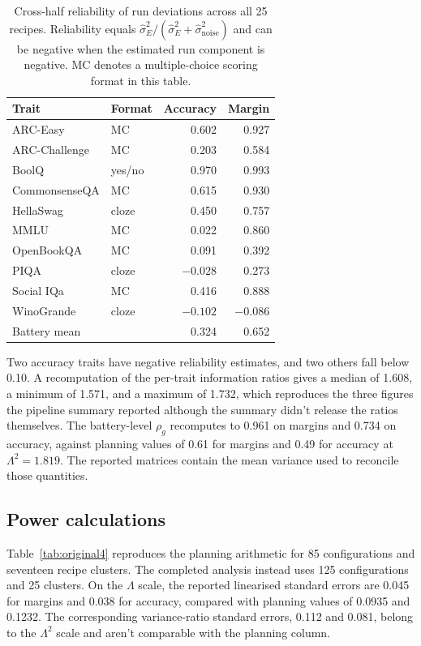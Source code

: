 \begin{table}[!htb]
\centering
\caption{Cross-half reliability of run deviations across all 25 recipes. Reliability equals $\widehat\sigma_E^2/(\widehat\sigma_E^2+\widehat\sigma_{\mathrm{noise}}^2)$ and can be negative when the estimated run component is negative. MC denotes a multiple-choice scoring format in this table.}
\label{tab:original3}
\small\setlength{\tabcolsep}{4pt}\renewcommand{\arraystretch}{1.12}
\begin{tabular}{llrr}\toprule
Trait & Format & Accuracy & Margin\\\midrule
ARC-Easy & MC & 0.602 & 0.927\\
ARC-Challenge & MC & 0.203 & 0.584\\
BoolQ & yes/no & 0.970 & 0.993\\
CommonsenseQA & MC & 0.615 & 0.930\\
HellaSwag & cloze & 0.450 & 0.757\\
MMLU & MC & 0.022 & 0.860\\
OpenBookQA & MC & 0.091 & 0.392\\
PIQA & cloze & $-0.028$ & 0.273\\
Social IQa & MC & 0.416 & 0.888\\
WinoGrande & cloze & $-0.102$ & $-0.086$\\
Battery mean & & 0.324 & 0.652\\\bottomrule
\end{tabular}
\end{table}

Two accuracy traits have negative reliability estimates, and two others fall below 0.10. A recomputation of the per-trait information ratios gives a median of 1.608, a minimum of 1.571, and a maximum of 1.732, which reproduces the three figures the pipeline summary reported although the summary didn't release the ratios themselves. The battery-level $\rho_g$ recomputes to 0.961 on margins and 0.734 on accuracy, against planning values of 0.61 for margins and 0.49 for accuracy at $\Lambda^2=1.819$. The reported matrices contain the mean variance used to reconcile those quantities.


\subsection{Power calculations}
Table~\ref{tab:original4} reproduces the planning arithmetic for 85 configurations and seventeen recipe clusters. The completed analysis instead uses 125 configurations and 25 clusters. On the $\Lambda$ scale, the reported linearised standard errors are 0.045 for margins and 0.038 for accuracy, compared with planning values of 0.0935 and 0.1232. The corresponding variance-ratio standard errors, 0.112 and 0.081, belong to the $\Lambda^2$ scale and aren't comparable with the planning column.


